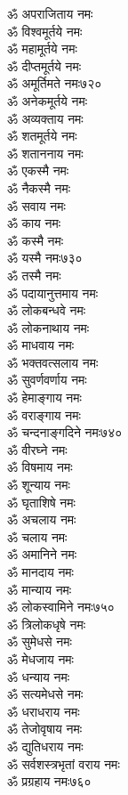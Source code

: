 \begin{multicols}{2}
\begin{flushleft}
ॐ अपराजिताय नमः\\
ॐ विश्वमूर्तये नमः\\
ॐ महामूर्तये नमः\\
ॐ दीप्तमूर्तये नमः\\
ॐ अमूर्तिमते नमः\hfill ७२०\\
ॐ अनेकमूर्तये नमः\\
ॐ अव्यक्ताय नमः\\
ॐ शतमूर्तये नमः\\
ॐ शताननाय नमः\\
ॐ एकस्मै नमः\\
ॐ नैकस्मै नमः\\
ॐ सवाय नमः\\
ॐ काय नमः\\
ॐ कस्मै नमः\\
ॐ यस्मै नमः\hfill ७३०\\
ॐ तस्मै नमः\\
ॐ पदायानुत्तमाय नमः\\
ॐ लोकबन्धवे नमः\\
ॐ लोकनाथाय नमः\\
ॐ माधवाय नमः\\
ॐ भक्तवत्सलाय नमः\\
ॐ सुवर्णवर्णाय नमः\\
ॐ हेमाङ्गाय नमः\\
ॐ वराङ्गाय नमः\\
ॐ चन्दनाङ्गदिने नमः\hfill ७४०\\
ॐ वीरघ्ने नमः\\
ॐ विषमाय नमः\\
ॐ शून्याय नमः\\
ॐ घृताशिषे नमः\\
ॐ अचलाय नमः\\
ॐ चलाय नमः\\
ॐ अमानिने नमः\\
ॐ मानदाय नमः\\
ॐ मान्याय नमः\\
ॐ लोकस्वामिने नमः\hfill ७५०\\
ॐ त्रिलोकधृषे नमः\\
ॐ सुमेधसे नमः\\
ॐ मेधजाय नमः\\
ॐ धन्याय नमः\\
ॐ सत्यमेधसे नमः\\
ॐ धराधराय नमः\\
ॐ तेजोवृषाय नमः\\
ॐ द्युतिधराय नमः\\
ॐ सर्वशस्त्रभृतां वराय नमः\\
ॐ प्रग्रहाय नमः\hfill ७६०\\

\end{flushleft}
\end{multicols}
